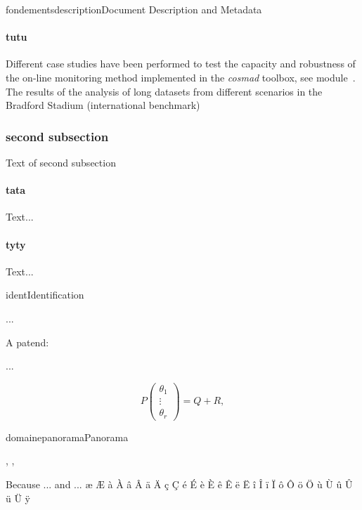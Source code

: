 \documentclass{ra2013}
\begin{document}
\begin{module}{fondements}{description}{Document Description and Metadata}
\paragraph{tutu}
Different case studies have been performed to test the capacity and robustness 
of the on-line monitoring method implemented in the \emph{cosmad} toolbox, 
see module~\protect{}.
The results of the analysis 
of long datasets from different scenarios in the Bradford Stadium (international benchmark)

\subsubsection{second subsection}
Text of second subsection
\paragraph{tata}
Text...

\paragraph{tyty}
Text...
\end{module}


\begin{module}{}{ident}{Identification}

...

A patend: \cite{Algo09} 

...

\begin{equation}
  P \left(\begin{array} {c}
     \theta_{1} \\ \vdots  \\ \theta_{r} 
\end{array}
  \right) = Q + R, \label{noisident}
\end{equation}

\end{module}


\begin{module}{domaine}{panorama}{Panorama}
\begin{participants}
  ,
  ,
\end{participants}


Because ... and ... æ Æ à À â Â ä Ä ç Ç é É è È ê Ê ë Ë î Î ï Ï ô Ô ö Ö ù Ù û Û ü Ü ÿ

\end{module}
\end{document}
